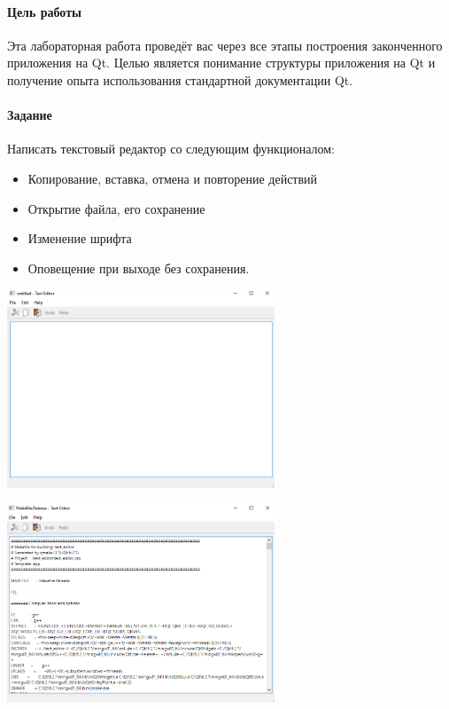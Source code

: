 \paragraph{Цель работы}
Эта лабораторная работа проведёт вас через все этапы построения законченного приложения на Qt. Целью является понимание структуры приложения на Qt и получение опыта использования стандартной документации Qt.

\paragraph{Задание}
Написать текстовый редактор со следующим функционалом:
\begin{itemize}
    \item Копирование, вставка, отмена и повторение действий
    \item Открытие файла, его сохранение
    \item Изменение шрифта
    \item Оповещение при выходе без сохранения.
\end{itemize}




\includegraphics[width=0.6\textwidth]{scr1.PNG}

\includegraphics[width=0.6\textwidth]{scr2.PNG}

